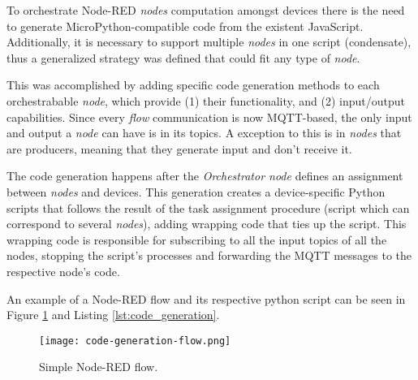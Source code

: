 To orchestrate Node-RED \textit{nodes} computation amongst devices there is the need to generate MicroPython-compatible code from the existent JavaScript. Additionally, it is necessary to support multiple \textit{nodes} in one script (\ie condensate), thus a generalized strategy was defined that could fit any type of \textit{node}.

This was accomplished by adding specific code generation methods to each orchestrabable \textit{node}, which provide (1) their functionality, and (2) input/output capabilities. Since every \textit{flow} communication is now MQTT-based, the only input and output a \textit{node} can have is in its topics. A exception to this is in \textit{nodes} that are producers, meaning that they generate input and don't receive it. 

The code generation happens after the \textit{Orchestrator node} defines an assignment between \textit{nodes} and devices. This generation creates a device-specific Python scripts that follows the result of the task assignment procedure (script which can correspond to several \textit{nodes}), adding wrapping code that ties up the script. This wrapping code is responsible for subscribing to all the input topics of all the nodes, stopping the script's processes and forwarding the MQTT messages to the respective node's code.

An example of a Node-RED flow and its respective python script can be seen in Figure \ref{fig:code_generation_flow} and Listing \ref{lst:code_generation}.

\begin{figure}[h]
    \centering
    \texttt{[image: code-generation-flow.png]}
    \caption{Simple Node-RED flow.}
    \label{fig:code_generation_flow}
\end{figure}

